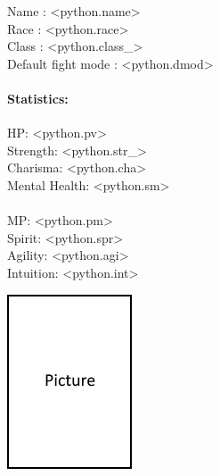 \begin{multicols}{2}
\begin{minipage}{1.25\linewidth}%
\raggedright
Name : <python.name> \\[4pt]
Race : <python.race> \\[4pt]
Class : <python.class_> \\[4pt]
Default fight mode : <python.dmod> \\[4pt]

\paragraph{Statistics:}
\begin{multicols}{2}%
\setlength{\columnsep}{40pt}
\begin{minipage}{1\linewidth}%
\raggedright
\vskip 4pt
HP: <python.pv> \\[4pt]
Strength: <python.str_> \\[4pt]
Charisma: <python.cha> \\[4pt]
Mental Health: <python.sm> \\[4pt]
\end{minipage}%
\columnbreak
\paragraph{}
\begin{minipage}{1\linewidth}%
\raggedright
\vskip 4pt
MP: <python.pm> \\[4pt]
Spirit: <python.spr> \\[4pt]
Agility: <python.agi> \\[4pt]
Intuition: <python.int> \\[4pt]
\end{minipage}%
\end{multicols}%
\end{minipage}%

\columnbreak

\begin{flushright}
    \graphicspath{{<python.imgpath>}}
    \includegraphics[scale=1]{empty.jpg}
\end{flushright}

\end{multicols}
\vskip 4pt
